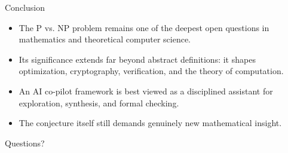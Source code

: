 \documentclass[aspectratio=43]{beamer}
\begin{document}
\begin{frame}{Conclusion}
\begin{itemize}
    \item The P vs\@. NP problem remains one of the deepest open questions in mathematics and theoretical computer science.
    \item Its significance extends far beyond abstract definitions: it shapes optimization, cryptography, verification, and the theory of computation.
    \item An AI co-pilot framework is best viewed as a disciplined assistant for exploration, synthesis, and formal checking.
    \item The conjecture itself still demands genuinely new mathematical insight.
\end{itemize}
\end{frame}

\begin{frame}[plain]
\centering
\Huge Questions?
\end{frame}
\end{document}

